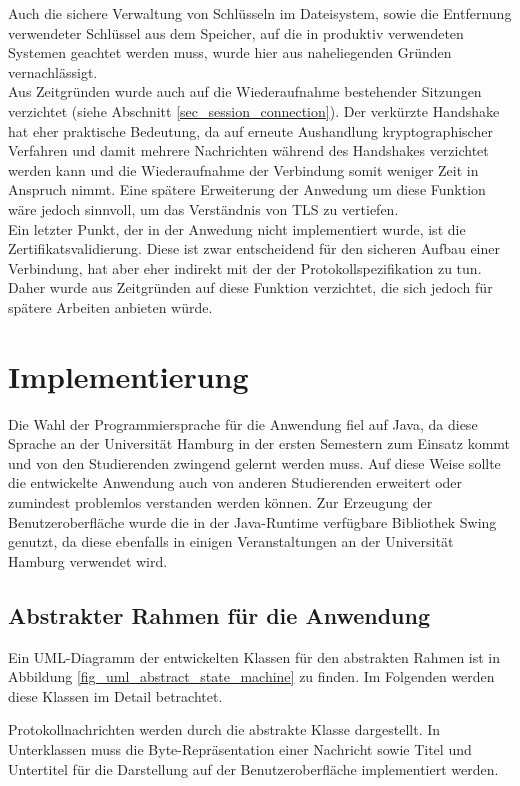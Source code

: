Auch die sichere Verwaltung von Schlüsseln im Dateisystem, sowie die Entfernung verwendeter Schlüssel aus dem Speicher, auf die in produktiv verwendeten Systemen geachtet werden muss, wurde hier aus naheliegenden Gründen vernachlässigt.\\
Aus Zeitgründen wurde auch auf die Wiederaufnahme bestehender Sitzungen verzichtet (siehe Abschnitt \ref{sec_session_connection}). Der verkürzte Handshake hat eher praktische Bedeutung, da auf erneute Aushandlung kryptographischer Verfahren und damit mehrere Nachrichten während des Handshakes verzichtet werden kann und die Wiederaufnahme der Verbindung somit weniger Zeit in Anspruch nimmt. Eine spätere Erweiterung der Anwedung um diese Funktion wäre jedoch sinnvoll, um das Verständnis von TLS zu vertiefen.\\
Ein letzter Punkt, der in der Anwedung nicht implementiert wurde, ist die Zertifikatsvalidierung. Diese ist zwar entscheidend für den sicheren Aufbau einer Verbindung, hat aber eher indirekt mit der der Protokollspezifikation zu tun. Daher wurde aus Zeitgründen auf diese Funktion verzichtet, die sich jedoch für spätere Arbeiten anbieten würde.

\section{Implementierung}

Die Wahl der Programmiersprache für die Anwendung fiel auf Java, da diese Sprache an der Universität Hamburg in der ersten Semestern zum Einsatz kommt und von den Studierenden zwingend gelernt werden muss. Auf diese Weise sollte die entwickelte Anwendung auch von anderen Studierenden erweitert oder zumindest problemlos verstanden werden können. Zur Erzeugung der Benutzeroberfläche wurde die in der Java-Runtime verfügbare Bibliothek Swing genutzt, da diese ebenfalls in einigen Veranstaltungen an der Universität Hamburg verwendet wird.

\subsection{Abstrakter Rahmen für die Anwendung}

Ein UML-Diagramm der entwickelten Klassen für den abstrakten Rahmen ist in Abbildung \ref{fig_uml_abstract_state_machine} zu finden. Im Folgenden werden diese Klassen im Detail betrachtet.

Protokollnachrichten werden durch die abstrakte Klasse  dargestellt. In Unterklassen muss die Byte-Repräsentation einer Nachricht sowie Titel und Untertitel für die Darstellung auf der Benutzeroberfläche implementiert werden.

